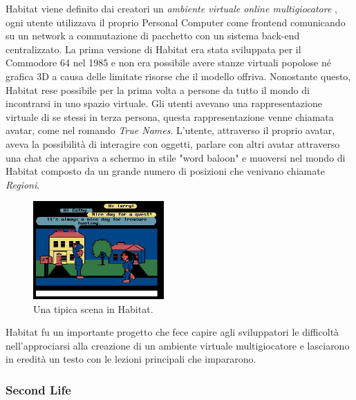         
        Habitat viene definito dai creatori un \textit{ambiente virtuale online multigiocatore} \cite{Habitat1990}, ogni utente utilizzava il proprio Personal Computer come frontend comunicando su un network a commutazione di pacchetto con un sistema back-end centralizzato.
        La prima versione di Habitat era stata sviluppata per il Commodore 64 nel 1985 e non era possibile avere stanze virtuali popolose né grafica 3D a causa delle limitate risorse che il modello offriva.
        Nonostante questo, Habitat rese possibile per la prima volta a persone da tutto il mondo di incontrarsi in uno spazio virtuale.
        Gli utenti avevano una rappresentazione virtuale di se stessi in terza persona, questa rappresentazione venne chiamata avatar, come nel romando \textit{True Names}.
        L'utente, attraverso il proprio avatar, aveva la possibilità di interagire con oggetti, parlare con altri avatar attraverso una chat che appariva a schermo in stile "word baloon" e muoversi nel mondo di Habitat composto da un grande numero di posizioni che venivano chiamate \textit{Regioni}.

        \begin{figure}[!ht]
            \centering
            \includegraphics[width=5cm]{figure/lessonshabitat.jpg}
            \caption{Una tipica scena in Habitat.}
        \end{figure}

        Habitat fu un importante progetto che fece capire agli sviluppatori le difficoltà nell'approciarsi alla creazione di un ambiente virtuale multigiocatore e lasciarono in eredità un testo con le lezioni principali che impararono. \cite{Habitat1990}
         
        \subsubsection{Second Life}

